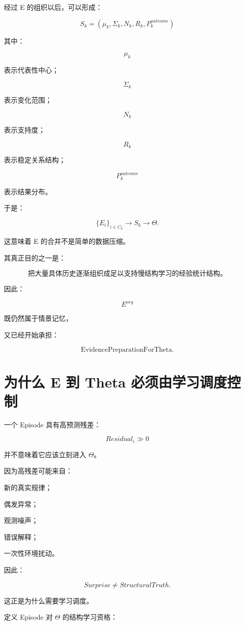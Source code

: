 经过 E 的组织以后，可以形成：

\[
\boxed{
S_k
=
(
\mu_k,
\Sigma_k,
N_k,
R_k,
P_k^{outcome}
)
}
\]

其中：

\[
\mu_k
\]

表示代表性中心；

\[
\Sigma_k
\]

表示变化范围；

\[
N_k
\]

表示支持度；

\[
R_k
\]

表示稳定关系结构；

\[
P_k^{outcome}
\]

表示结果分布。

于是：

\[
\{
E_i
\}_{i\in C_k}
\rightarrow
S_k
\rightarrow
\Theta.
\]

这意味着 E 的合并不是简单的数据压缩。

其真正目的之一是：

\[
\boxed{
\textbf{
把大量具体历史逐渐组织成足以支持慢结构学习的经验统计结构。
}
}
\]

因此：

\[
\boxed{
E^{org}
}
\]

既仍然属于情景记忆，

又已经开始承担：

\[
\boxed{
\text{EvidencePreparationForTheta}.
}
\]


\section{为什么 E 到 Theta 必须由学习调度控制}

一个 Episode 具有高预测残差：

\[
Residual_i\gg0
\]

并不意味着它应该立刻进入 \(\Theta\)。

因为高残差可能来自：

新的真实规律；

偶发异常；

观测噪声；

错误解释；

一次性环境扰动。

因此：

\[
\boxed{
Surprise
\neq
StructuralTruth.
}
\]

这正是为什么需要学习调度。

定义 Episode 对 \(\Theta\) 的结构学习资格：

